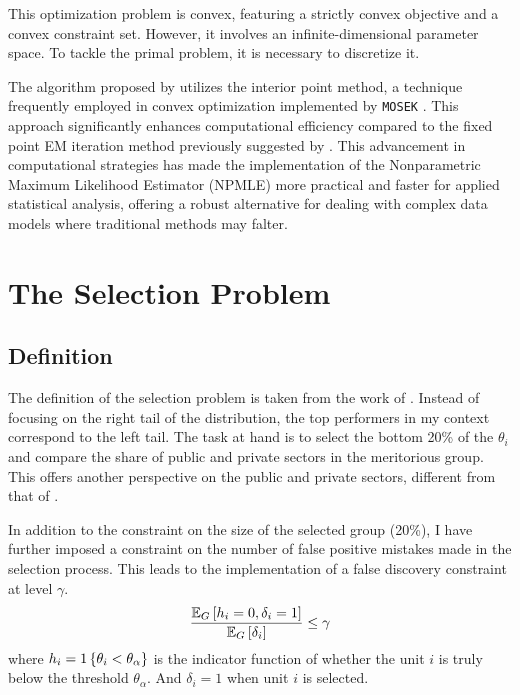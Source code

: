 \documentclass[12pt]{article}
\begin{document}
This optimization problem is convex, featuring a strictly convex objective and
a convex constraint set. However, it involves an infinite-dimensional parameter
space. To tackle the primal problem, it is necessary to discretize it.

The algorithm proposed by \citet{koenker2014convex} utilizes the interior point
method, a technique frequently employed in convex optimization implemented by
\verb+MOSEK+ \citep{andersen2010mosek}. This approach significantly enhances
computational efficiency compared to the fixed point EM iteration method
previously suggested by \citet{jiang2009general}. This advancement in
computational strategies has made the implementation of the Nonparametric
Maximum Likelihood Estimator (NPMLE) more practical and faster for applied
statistical analysis, offering a robust alternative for dealing with complex
data models where traditional methods may falter.


\section{The Selection Problem}
\subsection{Definition}
The definition of the selection problem is taken from the work of
\citet{gu2023invidious}. Instead of focusing on the right tail of the
distribution, the top performers in my context correspond to the left tail. The
task at hand is to select the bottom 20\% of the \( \theta_i \) and compare the
share of public and private sectors in the meritorious group. This offers
another perspective on the public and private sectors, different from that of
\citet{croiset2024hospitals}.

In addition to the constraint on the size of the selected group (20\%), I have
further imposed a constraint on the number of false positive mistakes made in
the selection process. This leads to the implementation of a false discovery
constraint at level \( \gamma \).
\begin{equation*}
    \frac{\mathbb{E}_G\left[h_i=0,\delta_i=1\right]}{\mathbb{E}_G\left[\delta_i\right]} \le \gamma
\end{equation*} where $h_i=1\left\{\theta_i<\theta_\alpha\right\}$ is the indicator function of whether the unit $i$ is truly below the threshold $\theta_\alpha$. And $\delta_i=1$ when unit $i$ is selected.
\end{document}
